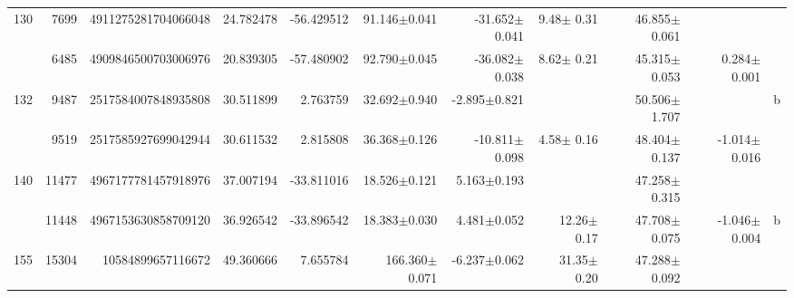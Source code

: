 \documentclass{ws-ijmpd}
\begin{document}
\begin{landscape}
\begin{longtable}{rrrrrrrrrrl}
 \hline 130 &    7699 &      4911275281704066048 &                    24.782478 &                   -56.429512 &                 91.146$\pm$0.041 &                -31.652$\pm$0.041 &           9.48$\pm$  0.31 &        46.855$\pm$0.061 &                                           &                                                    \\
            &    6485 &      4909846500703006976 &                    20.839305 &                   -57.480902 &                 92.790$\pm$0.045 &                -36.082$\pm$0.038 &           8.62$\pm$  0.21 &        45.315$\pm$0.053 &                           0.284$\pm$0.001 &                                                    \\
 \hline 132 &    9487 &      2517584007848935808 &                    30.511899 &                     2.763759 &                 32.692$\pm$0.940 &                 -2.895$\pm$0.821 &                           &        50.506$\pm$1.707 &                                           &                                                  b \\
            &    9519 &      2517585927699042944 &                    30.611532 &                     2.815808 &                 36.368$\pm$0.126 &                -10.811$\pm$0.098 &           4.58$\pm$  0.16 &        48.404$\pm$0.137 &                          -1.014$\pm$0.016 &                                                    \\
 \hline 140 &   11477 &      4967177781457918976 &                    37.007194 &                   -33.811016 &                 18.526$\pm$0.121 &                  5.163$\pm$0.193 &                           &        47.258$\pm$0.315 &                                           &                                                    \\
            &   11448 &      4967153630858709120 &                    36.926542 &                   -33.896542 &                 18.383$\pm$0.030 &                  4.481$\pm$0.052 &          12.26$\pm$  0.17 &        47.708$\pm$0.075 &                          -1.046$\pm$0.004 &                                                  b \\
 \hline 155 &   15304 &        10584899657116672 &                    49.360666 &                     7.655784 &                166.360$\pm$0.071 &                 -6.237$\pm$0.062 &          31.35$\pm$  0.20 &        47.288$\pm$0.092 &                                           &                                                    \\

\end{longtable}
\end{landscape}
\end{document}
